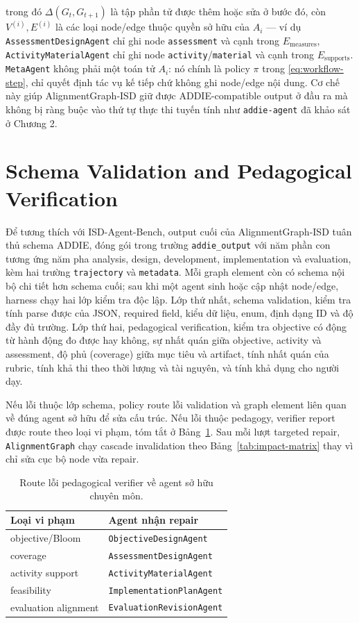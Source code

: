 \documentclass[../main.tex]{subfiles}
\begin{document}
trong đó $\Delta(G_t, G_{t+1})$ là tập phần tử được thêm hoặc sửa ở bước đó, còn $V^{(i)}, E^{(i)}$ là các loại node/edge thuộc quyền sở hữu của $A_i$ — ví dụ \texttt{AssessmentDesignAgent} chỉ ghi node \texttt{assessment} và cạnh trong $E_{\text{measures}}$, \texttt{ActivityMaterialAgent} chỉ ghi node \texttt{activity}/\texttt{material} và cạnh trong $E_{\text{supports}}$. \texttt{MetaAgent} không phải một toán tử $A_i$: nó chính là policy $\pi$ trong \eqref{eq:workflow-step}, chỉ quyết định tác vụ kế tiếp chứ không ghi node/edge nội dung. Cơ chế này giúp AlignmentGraph-ISD giữ được ADDIE-compatible output ở đầu ra mà không bị ràng buộc vào thứ tự thực thi tuyến tính như \texttt{addie-agent} đã khảo sát ở Chương 2.

\section{Schema Validation and Pedagogical Verification}
\label{sec:schema-verification}

Để tương thích với ISD-Agent-Bench, output cuối của AlignmentGraph-ISD tuân thủ schema ADDIE, đóng gói trong trường \texttt{addie\_output} với năm phần con tương ứng năm pha analysis, design, development, implementation và evaluation, kèm hai trường \texttt{trajectory} và \texttt{metadata}. Mỗi graph element còn có schema nội bộ chi tiết hơn schema cuối; sau khi một agent sinh hoặc cập nhật node/edge, harness chạy hai lớp kiểm tra độc lập. Lớp thứ nhất, schema validation, kiểm tra tính parse được của JSON, required field, kiểu dữ liệu, enum, định dạng ID và độ đầy đủ trường. Lớp thứ hai, pedagogical verification, kiểm tra objective có động từ hành động đo được hay không, sự nhất quán giữa objective, activity và assessment, độ phủ (coverage) giữa mục tiêu và artifact, tính nhất quán của rubric, tính khả thi theo thời lượng và tài nguyên, và tính khả dụng cho người dạy.

Nếu lỗi thuộc lớp schema, policy route lỗi validation và graph element liên quan về đúng agent sở hữu để sửa cấu trúc. Nếu lỗi thuộc pedagogy, verifier report được route theo loại vi phạm, tóm tắt ở Bảng~\ref{tab:violation-routing}. Sau mỗi lượt targeted repair, \texttt{AlignmentGraph} chạy cascade invalidation theo Bảng~\ref{tab:impact-matrix} thay vì chỉ sửa cục bộ node vừa repair.

\begin{table}[H]
\centering
\footnotesize
\caption{Route lỗi pedagogical verifier về agent sở hữu chuyên môn.}
\label{tab:violation-routing}
\begin{tabular}{p{4.5cm}p{4.0cm}}
\hline
\textbf{Loại vi phạm} & \textbf{Agent nhận repair} \\
\hline
objective/Bloom & \texttt{ObjectiveDesignAgent} \\
coverage & \texttt{AssessmentDesignAgent} \\
activity support & \texttt{ActivityMaterialAgent} \\
feasibility & \texttt{ImplementationPlanAgent} \\
evaluation alignment & \texttt{EvaluationRevisionAgent} \\
\hline
\end{tabular}
\end{table}
\end{document}

